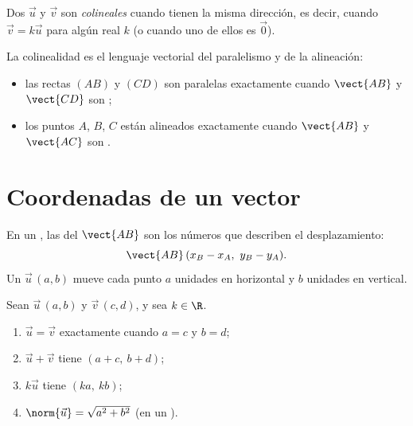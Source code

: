 \begin{definition}[Colinealidad]\label{def:g10:vectors:collinear}
Dos  $\vec u$ y $\vec v$ son
\emph{colineales} cuando tienen la misma
dirección, es decir, cuando $\vec v = k \vec u$ para algún real $k$ (o
cuando uno de ellos es $\vec 0$).
\end{definition}

\begin{remark}
La colinealidad es el lenguaje vectorial del paralelismo y de la
alineación:
\begin{itemize}
  \item las rectas $(AB)$ y $(CD)$ son paralelas exactamente cuando
        $\vect{AB}$ y $\vect{CD}$ son ;
  \item los puntos $A$, $B$, $C$ están alineados exactamente cuando
        $\vect{AB}$ y $\vect{AC}$ son .
\end{itemize}
\end{remark}

\section{Coordenadas de un vector}

\begin{definition}\label{def:g10:vectors:coords}
En un , las \emph{} del 
$\vect{AB}$ son los números que describen el desplazamiento:
\[
\vect{AB}\,(x_B - x_A,\ y_B - y_A).
\]
Un  $\vec u\,(a, b)$ mueve cada punto $a$ unidades en horizontal y
$b$ unidades en vertical.
\end{definition}

\begin{proposition}\label{prop:g10:vectors:coordrules}
Sean $\vec u\,(a, b)$ y $\vec v\,(c, d)$, y sea $k \in \R$.
\begin{enumerate}
  \item $\vec u = \vec v$ exactamente cuando $a = c$ y $b = d$;
  \item $\vec u + \vec v$ tiene  $(a + c,\ b + d)$;
  \item $k\vec u$ tiene  $(ka,\ kb)$;
  \item $\norm{\vec u} = \sqrt{a^2 + b^2}$ (en un ).
\end{enumerate}
\end{proposition}

